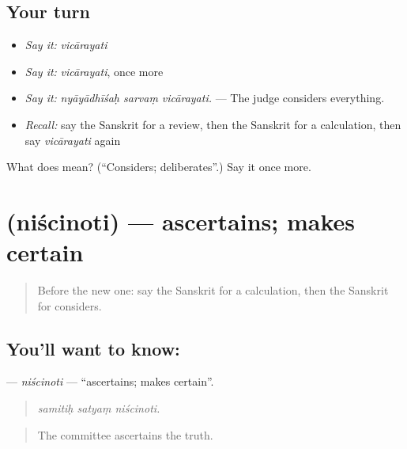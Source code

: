 \subsection*{Your turn}
\begin{itemize}
\raggedright
  \item \emph{Say it:} \emph{vicārayati}
  \item \emph{Say it:} \emph{vicārayati}, once more
  \item \emph{Say it:} \emph{nyāyādhīśaḥ sarvaṃ vicārayati.} — The judge considers everything.
  \item \emph{Recall:} say the Sanskrit for a review, then the Sanskrit for a calculation, then say \emph{vicārayati} again
\end{itemize}

\begin{tcolorbox}[breakable,colback=teal!4,colframe=teal!35!black,title={Before you move on}]
What does  mean? (\textquotedblleft{}Considers; deliberates\textquotedblright{}.) Say it once more.
\end{tcolorbox}
\section[\texorpdfstring{\sk{निश्चिनोति} (niścinoti)}{निश्चिनोति (niścinoti)}]{ (niścinoti) — ascertains; makes certain}

\label{lesson:SA-C366-niscinoti}



\begin{quote}
Before the new one: say the Sanskrit for a calculation, then the Sanskrit for considers.
\end{quote}

\subsection*{You'll want to know: }
\textbf{} — \emph{niścinoti} — \textquotedblleft{}ascertains; makes certain\textquotedblright{}.

\begin{quote}
  
\end{quote}

\begin{quote}
\emph{samitiḥ satyaṃ niścinoti.}
\end{quote}

\begin{quote}
The committee ascertains the truth.
\end{quote}

